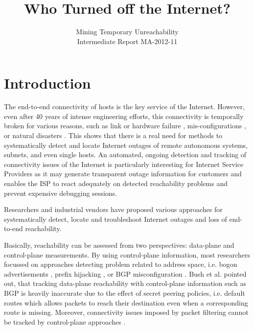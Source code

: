 \documentclass{sigcomm-alternate}
\begin{document}
 
\title{Who Turned off the Internet?} 
\subtitle{Mining Temporary Unreachability\\ \Large Intermediate Report MA-2012-11}

\author{ 
}

\maketitle 
\section{Introduction}
The end-to-end connectivity of hosts is the key service of the Internet.
However, even after 40 years of intense engineering efforts, this
connectivity is temporally broken for various reasons, such as link
or hardware failure \cite{Markopoulou:2008}, mis-configurations
\cite{Mahajan:2002}, or natural disasters
\cite{Dainotti:2012:EBH,Schulman:2011}.
This shows that there is a real need for methods to systematically
detect and locate Internet outages of remote autonomous systems,
subnets, and even single hosts. An automated, ongoing detection and
tracking of connectivity issues of the Internet is particularly
interesting for Internet Service Providers as it may generate
transparent outage information for customers and enables the ISP
to react adequately on detected reachability problems and prevent
expensive debugging sessions.

Researchers and industrial vendors have proposed various approaches
for systematically detect, locate and troubleshoot Internet outages
and loss of end-to-end reachability.

Basically, reachability can be assessed from two perspectives:
data-plane and control-plane measurements. By using control-plane
information, most researchers focussed on approaches detecting
problem related to address space, i.e. bogon advertisements
\cite{Feamster:2005}, prefix hijacking \cite{Zhang:2010},
or BGP misconfiguration \cite{Mahajan:2002}. Bush et al.\cite{Bush:Optometry} 
pointed out, that tracking data-plane
reachability with control-plane information such as BGP is heavily
inaccurate due to the effect of secret peering policies, i.e. default
routes which allows packets to reach their destination even when a
corresponding route is missing.
Moreover, connectivity issues imposed by packet filtering cannot
be tracked by control-plane approaches \cite{Dainotti:2011:ACI}.
\end{document}
